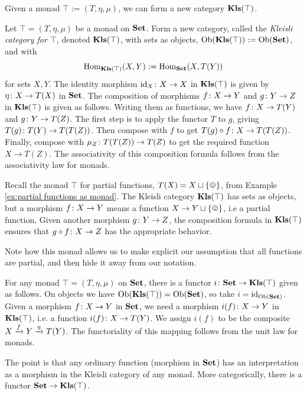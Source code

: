 \documentclass[CT4S-EN-RU]{subfiles}
\begin{document}
Given a monad $\top:=(T,\eta,\mu)$, we can form a new category ${\bf Kls}(\top)$.

\begin{definition}\label{def:kleisli}

Let $\top=(T,\eta,\mu)$ be a monad on ${\bf Set}$. Form a new category, called the {\em Kleisli category for $\top$}, denoted ${\bf Kls}(\top)$, with sets as objects, $\textnormal{Ob}({\bf Kls}(\top)):=\textnormal{Ob}({\bf Set})$, and with $$\textnormal{Hom}_{{\bf Kls}(\top)}(X,Y):=\textnormal{Hom}_{\bf Set}(X,T(Y))$$ for sets $X,Y$. The identity morphism $\textnormal{id}_X\colon X\rightarrow X$ in ${\bf Kls}(\top)$ is given by $\eta\colon X\rightarrow T(X)$ in ${\bf Set}$. The composition of morphisms $f\colon X\rightarrow Y$ and $g\colon Y\rightarrow Z$ in ${\bf Kls}(\top)$ is given as follows. Writing them as functions, we have $f\colon X\rightarrow T(Y)$ and $g\colon Y\rightarrow T(Z)$. The first step is to apply the functor $T$ to $g$, giving $T(g)\colon T(Y)\rightarrow T(T(Z))$. Then compose with $f$ to get $T(g)\circ f\colon X\rightarrow T(T(Z))$. Finally, compose with $\mu_Z\colon T(T(Z))\rightarrow T(Z)$ to get the required function $X\to T(Z)$. The associativity of this composition formula follows from the associativity law for monads.

\end{definition}

\begin{example}

Recall the monad $\top$ for partial functions, $T(X)=X\sqcup\singleton$, from Example \ref{ex:partial functions as monad}. The Kleisli category ${\bf Kls}(\top)$ has sets as objects, but a morphism $f\colon X\rightarrow Y$ means a function $X\to Y\sqcup\singleton$, i.e a partial function. Given another morphism $g\colon Y\rightarrow Z$, the composition formula in ${\bf Kls}(\top)$ ensures that $g\circ f\colon X\rightarrow Z$ has the appropriate behavior.

Note how this monad allows us to make explicit our assumption that all functions are partial, and then hide it away from our notation.

\end{example}

\begin{remark}\label{rem:ordinary are kleisli}

For any monad $\top=(T,\eta,\mu)$ on ${\bf Set}$, there is a functor $i\colon {\bf Set}\rightarrow{\bf Kls}(\top)$ given as follows. On objects we have $\textnormal{Ob}({\bf Kls}(\top))=\textnormal{Ob}({\bf Set})$, so take $i=\textnormal{id}_{\textnormal{Ob}({\bf Set})}$. Given a morphism $f\colon X\rightarrow Y$ in ${\bf Set}$, we need a morphism $i(f)\colon X\rightarrow Y$ in ${\bf Kls}(\top)$, i.e. a function $i(f)\colon X\rightarrow T(Y)$. We assign $i(f)$ to be the composite $X\xrightarrow{f}Y\xrightarrow{\eta}T(Y)$. The functoriality of this mapping follows from the unit law for monads.

The point is that any ordinary function (morphism in ${\bf Set}$) has an interpretation as a morphism in the Kleisli category of any monad. More categorically, there is a functor ${\bf Set}\rightarrow{\bf Kls}(\top)$.

\end{remark}
\end{document}
